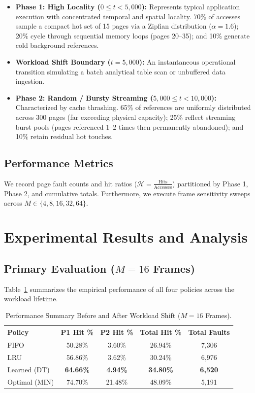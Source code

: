 \documentclass[10pt,twocolumn,a4paper]{article}
\begin{document}
\begin{itemize}
    \item \textbf{Phase 1: High Locality ($0 \le t < 5,000$):} Represents typical application execution with concentrated temporal and spatial locality. 70\% of accesses sample a compact hot set of 15 pages via a Zipfian distribution ($\alpha = 1.6$); 20\% cycle through sequential memory loops (pages 20--35); and 10\% generate cold background references.
    \item \textbf{Workload Shift Boundary ($t = 5,000$):} An instantaneous operational transition simulating a batch analytical table scan or unbuffered data ingestion.
    \item \textbf{Phase 2: Random / Bursty Streaming ($5,000 \le t < 10,000$):} Characterized by cache thrashing. 65\% of references are uniformly distributed across 300 pages (far exceeding physical capacity); 25\% reflect streaming burst pools (pages referenced 1--2 times then permanently abandoned); and 10\% retain residual hot touches.
\end{itemize}

\subsection{Performance Metrics}
We record page fault counts and hit ratios ($\mathcal{H} = \frac{\text{Hits}}{\text{Accesses}}$) partitioned by Phase 1, Phase 2, and cumulative totals. Furthermore, we execute frame sensitivity sweeps across $M \in \{4, 8, 16, 32, 64\}$.

\section{Experimental Results and Analysis}

\subsection{Primary Evaluation ($M = 16$ Frames)}
Table~\ref{tab:summary_metrics} summarizes the empirical performance of all four policies across the workload lifetime.

\begin{table}[h]
\centering
\small
\caption{Performance Summary Before and After Workload Shift ($M=16$ Frames).}
\label{tab:summary_metrics}
\begin{tabular}{lcccc}
\toprule
\textbf{Policy} & \textbf{P1 Hit \%} & \textbf{P2 Hit \%} & \textbf{Total Hit \%} & \textbf{Total Faults} \\
\midrule
FIFO            & 50.28\% & 3.60\%  & 26.94\% & 7,306 \\
LRU             & 56.86\% & 3.62\%  & 30.24\% & 6,976 \\
Learned (DT)    & \textbf{64.66\%} & \textbf{4.94\%}  & \textbf{34.80\%} & \textbf{6,520} \\
Optimal (MIN)   & 74.70\% & 21.48\% & 48.09\% & 5,191 \\
\bottomrule
\end{tabular}
\end{table}
\end{document}
